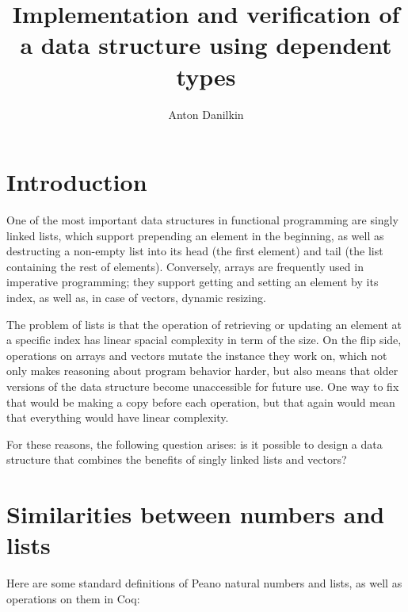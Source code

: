 \documentclass{article}
\title{Implementation and verification of a data structure using dependent types}
\author{Anton Danilkin}
\newenvironment{no_space_center}
    {\parskip=0pt\par\nopagebreak\centering}
    {\par\noindent\ignorespacesafterend}
\begin{document}
\begin{no_space_center}
    \begin{minipage}{10cm}
        \maketitle
    \end{minipage}
\end{no_space_center}

\begin{abstract}
    
\end{abstract}

\vspace{10cm}

\section{Introduction}

One of the most important data structures in functional programming are singly linked lists, which support prepending an element in the beginning, as well as destructing a non-empty list into its head (the first element) and tail (the list containing the rest of elements). Conversely, arrays are frequently used in imperative programming; they support getting and setting an element by its index, as well as, in case of vectors, dynamic resizing.

The problem of lists is that the operation of retrieving or updating an element at a specific index has linear spacial complexity in term of the size. On the flip side, operations on arrays and vectors mutate the instance they work on, which not only makes reasoning about program behavior harder, but also means that older versions of the data structure become unaccessible for future use. One way to fix that would be making a copy before each operation, but that again would mean that everything would have linear complexity.

For these reasons, the following question arises: is it possible to design a data structure that combines the benefits of singly linked lists and vectors?

\section{Similarities between numbers and lists}

Here are some standard definitions of Peano natural numbers and lists, as well as operations on them in Coq:
\end{document}
